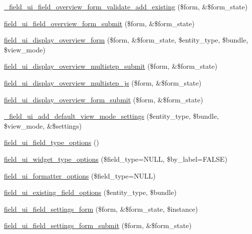 \begin{DoxyCompactItemize}
\item 
\hyperlink{field__ui_8admin_8inc_af37b017d0f737108fe36a3a7510d7c41}{\_\-field\_\-ui\_\-field\_\-overview\_\-form\_\-validate\_\-add\_\-existing} (\$form, \&\$form\_\-state)
\item 
\hyperlink{field__ui_8admin_8inc_ae8451ea140d864dd6c91fd9ac6703764}{field\_\-ui\_\-field\_\-overview\_\-form\_\-submit} (\$form, \&\$form\_\-state)
\item 
\hyperlink{group__forms_gad03c0a01179bc9ebb22b5c35784e1abf}{field\_\-ui\_\-display\_\-overview\_\-form} (\$form, \&\$form\_\-state, \$entity\_\-type, \$bundle, \$view\_\-mode)
\item 
\hyperlink{field__ui_8admin_8inc_a5003d474d7984c50c9a16b33c5c4c403}{field\_\-ui\_\-display\_\-overview\_\-multistep\_\-submit} (\$form, \&\$form\_\-state)
\item 
\hyperlink{field__ui_8admin_8inc_abd91546e06594b68f40656e84141cacd}{field\_\-ui\_\-display\_\-overview\_\-multistep\_\-js} (\$form, \&\$form\_\-state)
\item 
\hyperlink{field__ui_8admin_8inc_a06179df88eafaa552c7eeb5fdd144ccf}{field\_\-ui\_\-display\_\-overview\_\-form\_\-submit} (\$form, \&\$form\_\-state)
\item 
\hyperlink{field__ui_8admin_8inc_a444323528e98019f3b4f0f4a9cbb4946}{\_\-field\_\-ui\_\-add\_\-default\_\-view\_\-mode\_\-settings} (\$entity\_\-type, \$bundle, \$view\_\-mode, \&\$settings)
\item 
\hyperlink{field__ui_8admin_8inc_afc9556060992445e85040f87255db971}{field\_\-ui\_\-field\_\-type\_\-options} ()
\item 
\hyperlink{field__ui_8admin_8inc_a70b5ea8f37ddfa9d3dffa9c25e51a7da}{field\_\-ui\_\-widget\_\-type\_\-options} (\$field\_\-type=NULL, \$by\_\-label=FALSE)
\item 
\hyperlink{field__ui_8admin_8inc_a88c9dd1dd2d56b80a7ab2b0ef9b2632b}{field\_\-ui\_\-formatter\_\-options} (\$field\_\-type=NULL)
\item 
\hyperlink{field__ui_8admin_8inc_a982f82937a7a2baa0bbd6ad9ebe37ac6}{field\_\-ui\_\-existing\_\-field\_\-options} (\$entity\_\-type, \$bundle)
\item 
\hyperlink{group__forms_gaf347f488d97997991b92aae7060a10f2}{field\_\-ui\_\-field\_\-settings\_\-form} (\$form, \&\$form\_\-state, \$instance)
\item 
\hyperlink{field__ui_8admin_8inc_a6fe96f11dbf7f63b4723c77abe423654}{field\_\-ui\_\-field\_\-settings\_\-form\_\-submit} (\$form, \&\$form\_\-state)
\item 

\end{DoxyCompactItemize}

